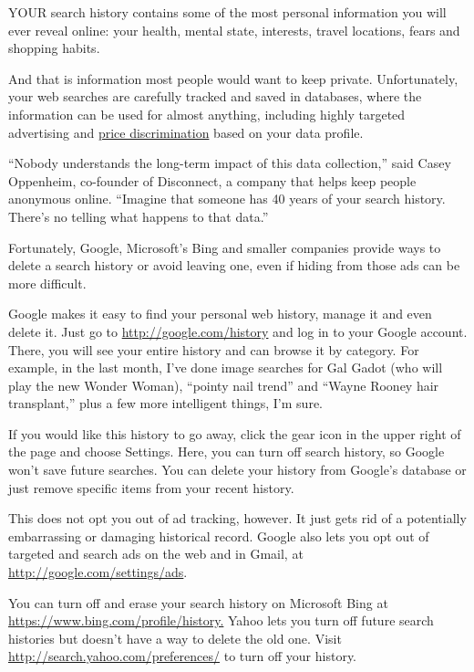 YOUR search history contains some of the most personal information you
will ever reveal online: your health, mental state, interests, travel
locations, fears and shopping habits.

And that is information most people would want to keep private.
Unfortunately, your web searches are carefully tracked and saved in
databases, where the information can be used for almost anything,
including highly targeted advertising and
\href{http://www.forbes.com/sites/modeledbehavior/2013/09/01/will-big-data-bring-more-price-discrimination/}{price
discrimination} based on your data profile.

``Nobody understands the long-term impact of this data collection,''
said Casey Oppenheim, co-founder of Disconnect, a company that helps
keep people anonymous online. ``Imagine that someone has 40 years of
your search history. There's no telling what happens to that data.''

Fortunately, Google, Microsoft's Bing and smaller companies provide ways
to delete a search history or avoid leaving one, even if hiding from
those ads can be more difficult.

Google makes it easy to find your personal web history, manage it and
even delete it. Just go to
\href{http://google.com/history}{http://google.com/history} and log in
to your Google account. There, you will see your entire history and can
browse it by category. For example, in the last month, I've done image
searches for Gal Gadot (who will play the new Wonder Woman), ``pointy
nail trend'' and ``Wayne Rooney hair transplant,'' plus a few more
intelligent things, I'm sure.

If you would like this history to go away, click the gear icon in the
upper right of the page and choose Settings. Here, you can turn off
search history, so Google won't save future searches. You can delete
your history from Google's database or just remove specific items from
your recent history.

This does not opt you out of ad tracking, however. It just gets rid of a
potentially embarrassing or damaging historical record. Google also lets
you opt out of targeted and search ads on the web and in Gmail, at
\href{http://google.com/settings/ads}{http://google.com/settings/ads}.

You can turn off and erase your search history on Microsoft Bing at
\href{https://www.bing.com/profile/history}{https://www.bing.com/profile/history.}
Yahoo lets you turn off future search histories but doesn't have a way
to delete the old one. Visit
\href{http://search.yahoo.com/preferences/}{http://search.yahoo.com/preferences/}
to turn off your history.


